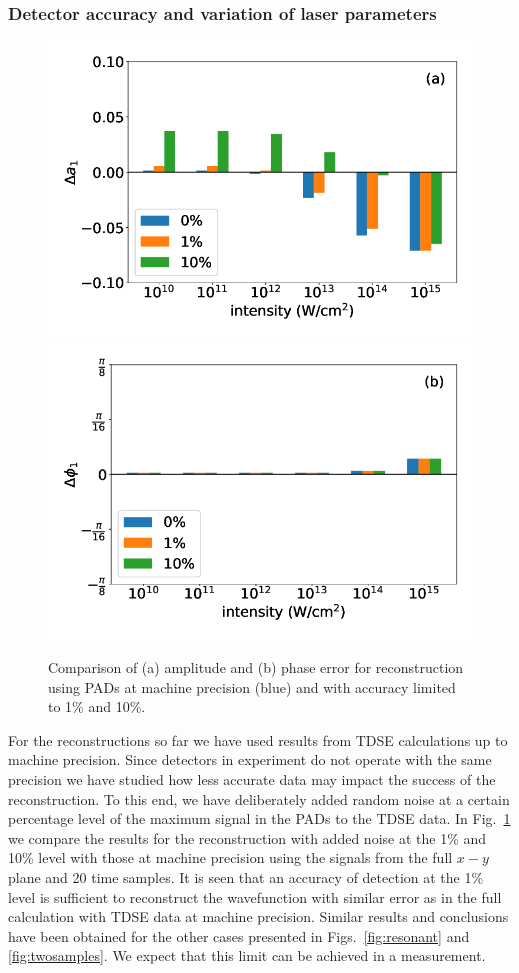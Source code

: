 \subsubsection{Detector accuracy and variation of laser parameters}

\begin{figure}[!ht]
\centering
\includegraphics[width=0.49\linewidth]{figs/Photo_ionization/superpositions/Venzke_new_fig_8a.png}
\includegraphics[width=0.49\linewidth]{figs/Photo_ionization/superpositions/Venzke_new_fig_8b.png}
\caption{
Comparison of (a) amplitude and (b) phase error for reconstruction using PADs at machine precision (blue) and with accuracy limited to 1\% and 10\%.
}
  \label{fig:detector}
\end{figure}

For the reconstructions so far
we have used results from TDSE calculations up to machine precision. Since detectors in experiment do not operate with the same precision we have studied how less accurate data may impact the success of the reconstruction. To this end, we have deliberately added random noise at a certain percentage level of the maximum signal in the PADs to the TDSE data. In Fig.\ \ref{fig:detector} we compare the results for the reconstruction with added noise at the  1\% and  10\% level with those at machine precision using the signals from the full $x-y$ plane and 20 time samples. It is seen that an accuracy of detection at the 1\% level is sufficient to reconstruct the wavefunction with similar error as in the full calculation with TDSE data at machine precision. Similar results and conclusions have been obtained for the other cases presented in Figs.\ \ref{fig:resonant} and \ref{fig:twosamples}. We expect that this limit can be achieved in a measurement.

